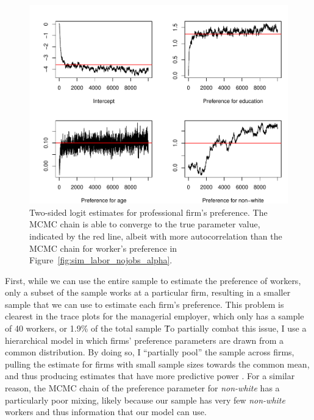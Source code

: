 \begin{figure}[tbp]
  \centering
  \includegraphics[width=\textwidth,keepaspectratio]{../figure/sim_labor_nojobs_beta_emp2}
  \caption[Estimates for professional firm's preference.]{Two-sided
    logit estimates for professional firm's preference. The MCMC chain is able
    to converge to the true parameter value, indicated by the red line, albeit
    with more autocorrelation than the MCMC chain for worker's preference in
    Figure~\ref{fig:sim_labor_nojobs_alpha}.}
  \label{fig:sim_labor_nojobs_beta_emp2}
\end{figure}

First, while we can use the entire sample to estimate the preference of workers,
only a subset of the sample works at a particular firm, resulting in a smaller
sample that we can use to estimate each firm's preference. This problem is
clearest in the trace plots for the managerial employer, which only has a sample
of 40 workers, or 1.9\% of the total sample \. To partially combat this issue, I
use a hierarchical model in which firms' preference parameters are drawn from a
common distribution. By doing so, I ``partially pool'' the sample across firms,
pulling the estimate for firms with small sample sizes towards the common mean,
and thus producing estimates that have more predictive power \citep{Gelman2006}.
For a similar reason, the MCMC chain of the preference parameter for
\textit{non-white} has a particularly poor mixing, likely because our sample has
very few \textit{non-white} workers and thus information that our model can use.

